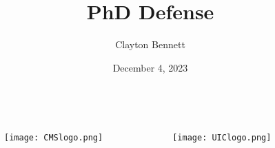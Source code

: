 \documentclass[9pt]{beamer}
\title[PhD Defense] %
      {\textbf{PhD Defense}}
\author[Clayton Bennett] %
       {Clayton Bennett}
\institute[UIC] %
{
               
  University of Illinois at Chicago \\
  The CMS Collaboration
  
}
\date[4 Dec 2023] %
     {December 4, 2023}
\begin{document}
     \graphicspath{ {/home/clayton/thesis/shared/figures} }

     \begin{frame}
       \titlepage
       \begin{columns}
	 \centering
	 \begin{figure}
	   \texttt{[image: CMSlogo.png]}
	 \end{figure}
	 
	 \begin{figure}
	   \texttt{[image: UIClogo.png]}
	 \end{figure}
       \end{columns}
     \end{frame}



     
     
     
     
     
     
     
     
     
     
     
     
     
     
     
     
     
     
     
     
     
     
     
     
     
     
     
     
     
     
     


     
\end{document}
